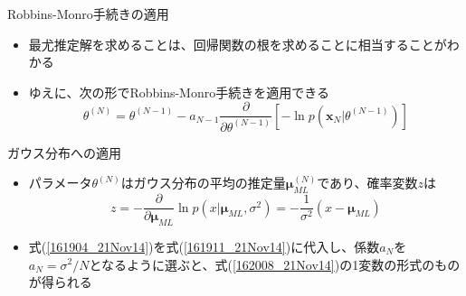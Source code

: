\begin{frame}{Robbins-Monro手続きの適用}
 \begin{itemize}
  \item 最尤推定解を求めることは、回帰関数の根を求めることに相当することがわかる
  \item ゆえに、次の形でRobbins-Monro手続きを適用できる
        \begin{equation}
         \theta^{(N)}=\theta^{(N-1)}-a_{N-1}\frac{\partial}{\partial \theta^{(N-1)}}[-\ln p(\bm{x}_N|\theta^{(N-1)})]\label{161911_21Nov14}
        \end{equation}
 \end{itemize}
\end{frame}

\begin{frame}{ガウス分布への適用}
 \begin{itemize}
  \item パラメータ$\theta^{(N)}$はガウス分布の平均の推定量$\bm{\mu}_{ML}^{(N)}$であり、確率変数$z$は
        \begin{equation}
         z=-\frac{\partial}{\partial \bm{\mu}_{ML}} \ln p(x|\bm{\mu}_{ML}, \sigma^2) = -\frac{1}{\sigma^2}(x-\bm{\mu}_{ML})\label{161904_21Nov14}
        \end{equation}
  \item 式(\ref{161904_21Nov14})を式(\ref{161911_21Nov14})に代入し、係数$a_N$を$a_N=\sigma^2/N$となるように選ぶと、式(\ref{162008_21Nov14})の1変数の形式のものが得られる
 \end{itemize}
\end{frame}
